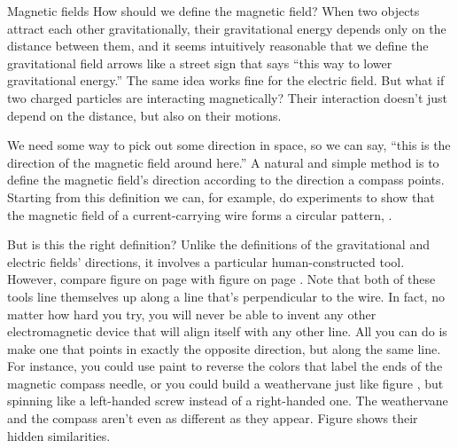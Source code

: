 \begin{envsubsection}{Magnetic fields}
How should we define the magnetic field? When two objects attract each other gravitationally, their
gravitational energy depends only on the distance between them, and it seems intuitively reasonable
that we define the gravitational field arrows like a street sign that says ``this way to lower
gravitational energy.'' The same idea works fine for the electric field. But what if two charged
particles are interacting magnetically? Their interaction doesn't just depend on the distance, but
also on their motions.

We need some way to pick out some direction in space, so we can say, ``this is the direction
of the magnetic field around here.'' A natural and simple method is to define the magnetic field's
direction according to the direction a compass points. Starting from this definition we can, for example,
do experiments to show that the magnetic field of a current-carrying wire forms a circular pattern,
.

But is this the right definition? Unlike the
definitions of the gravitational and electric fields' directions, it involves a particular human-constructed
tool. However, compare figure  on page \pageref{fig:oersted} with figure
 on page \pageref{fig:weathervane}. Note that both of these tools line themselves
up along a line that's perpendicular to the wire. In fact, no matter how hard you try, you will never
be able to invent any other electromagnetic device that will align itself with any other line. All you
can do is make one that points in exactly the opposite direction, but along the same line. For instance,
you could use paint to reverse the colors that label the ends of the magnetic compass needle, or you
could build a weathervane just like figure , but spinning like a left-handed screw
instead of a right-handed one. The weathervane and the compass aren't even as different as they appear.
Figure  shows their hidden similarities.\label{arbitrarydirectionofmag}



\end{envsubsection}
